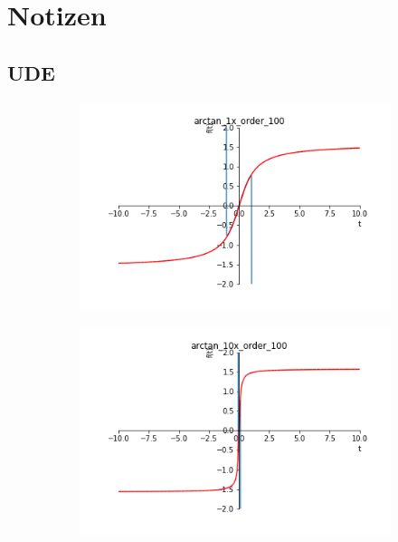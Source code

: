 \documentclass[arbeit=studie,oneside,BCOR=12mm]{ArbeitRST}
\begin{document}
%

\chapter{Notizen}

\section{UDE}

\begin{figure}[ht]
\begin{subfigure}[c]{0.5\textwidth}
\centering
\includegraphics[width=1\textwidth]{images/arctan_1x_order_100}

\end{subfigure}
\begin{subfigure}[c]{0.5\textwidth}
\centering
\includegraphics[width=1\textwidth]{images/arctan_10x_order_100}


\end{subfigure}
\end{figure}
\end{document}

